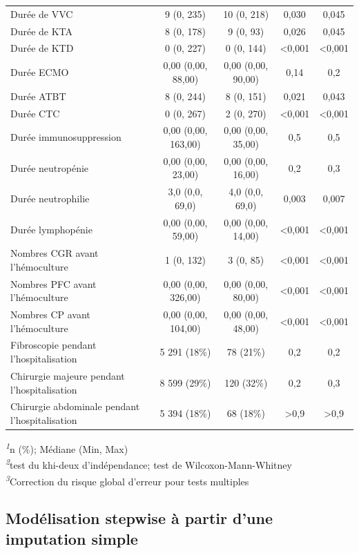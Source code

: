 \documentclass[
  french,
  letterpaper,
  DIV=11,
  numbers=noendperiod,
  justified]{scrartcl}
\begin{document}
\begin{table}
\begin{tabular*}{\linewidth}{@{\extracolsep{\fill}}lcccc}
Durée de VVC  & 9 (0, 235) & 10 (0, 218) & 0,030 & 0,045 \\
Durée de KTA  & 8 (0, 178) & 9 (0, 93) & 0,026 & 0,045 \\
Durée de KTD  & 0 (0, 227) & 0 (0, 144) & <0,001 & <0,001 \\
Durée ECMO  & 0,00 (0,00, 88,00) & 0,00 (0,00, 90,00) & 0,14 & 0,2 \\
Durée ATBT  & 8 (0, 244) & 8 (0, 151) & 0,021 & 0,043 \\
Durée CTC  & 0 (0, 267) & 2 (0, 270) & <0,001 & <0,001 \\
Durée immunosuppression  & 0,00 (0,00, 163,00) & 0,00 (0,00, 35,00) & 0,5 & 0,5 \\
Durée neutropénie  & 0,00 (0,00, 23,00) & 0,00 (0,00, 16,00) & 0,2 & 0,3 \\
Durée neutrophilie  & 3,0 (0,0, 69,0) & 4,0 (0,0, 69,0) & 0,003 & 0,007 \\
Durée lymphopénie  & 0,00 (0,00, 59,00) & 0,00 (0,00, 14,00) & <0,001 & <0,001 \\
Nombres CGR avant l'hémoculture & 1 (0, 132) & 3 (0, 85) & <0,001 & <0,001 \\
Nombres PFC avant l'hémoculture & 0,00 (0,00, 326,00) & 0,00 (0,00, 80,00) & <0,001 & <0,001 \\
Nombres CP avant l'hémoculture & 0,00 (0,00, 104,00) & 0,00 (0,00, 48,00) & <0,001 & <0,001 \\
Fibroscopie pendant l'hospitalisation & 5 291 (18\%) & 78 (21\%) & 0,2 & 0,2 \\
Chirurgie majeure pendant l'hospitalisation & 8 599 (29\%) & 120 (32\%) & 0,2 & 0,3 \\
Chirurgie abdominale pendant l'hospitalisation & 5 394 (18\%) & 68 (18\%) & >0,9 & >0,9 \\
\bottomrule
\end{tabular*}
\begin{minipage}{\linewidth}
\vspace{.05em}
\textsuperscript{\textit{1}}n (\%); Médiane (Min, Max)\\
\textsuperscript{\textit{2}}test du khi-deux d'indépendance; test de Wilcoxon-Mann-Whitney\\
\textsuperscript{\textit{3}}Correction du risque global d'erreur pour tests multiples\\
\end{minipage}
\end{table}

\subsection{Modélisation stepwise à partir d'une imputation
simple}\label{moduxe9lisation-stepwise-uxe0-partir-dune-imputation-simple}
\end{document}
